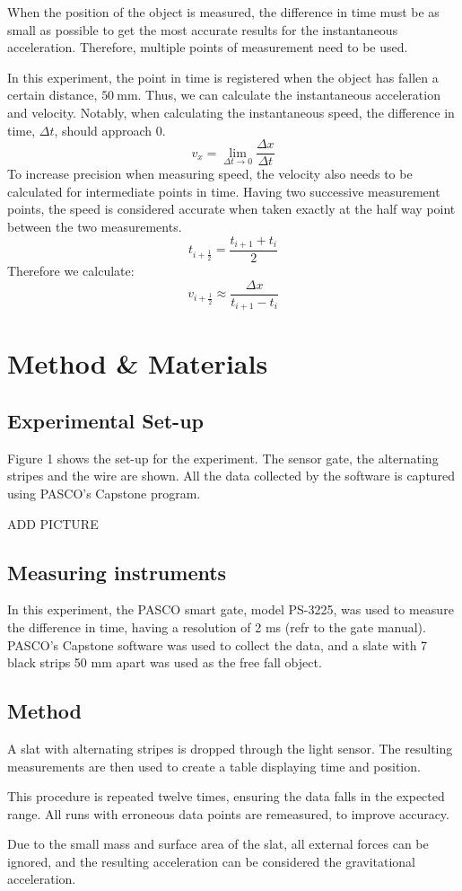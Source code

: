 \documentclass[a4paper]{article}
\newcommand{\unit}[1]{~\mathrm{#1}}
\begin{document}
\begin{justify}
\noindent
When the position of the object is measured, the difference in time must be as
small as possible to get the most accurate results for the instantaneous
acceleration. Therefore, multiple points of measurement need to be used.

\noindent
In this experiment, the point in time is registered when the object has fallen a
certain distance, $50\unit{mm}$. Thus, we can calculate the instantaneous
acceleration and velocity. Notably, when calculating the instantaneous speed,
the difference in time, $\Delta t$, should approach 0.
\begin{equation}
    v_x = \lim_{\Delta t \rightarrow 0}\frac{\Delta x}{\Delta t}
\end{equation}
To increase precision when measuring speed, the velocity also needs to be
calculated for intermediate points in time. Having two successive measurement
points, the speed is considered accurate when taken exactly at the half way
point between the two measurements.
\begin{equation}
    t_{i+\frac{1}{2}} = \frac{t_{i+1} + t_i}{2}
\end{equation}
Therefore we calculate:
\begin{equation}
    v_{i+\frac{1}{2}} \approx \frac{\Delta x}{t_{i+1} - t_i}
\end{equation}
\section{Method \& Materials}
\subsection{Experimental Set-up}
Figure 1 shows the set-up for the experiment. The sensor gate, the alternating
stripes and the wire are shown. All the data collected by the software is
captured using PASCO's Capstone program.

ADD PICTURE
\subsection{Measuring instruments}
In this experiment, the PASCO smart gate, model PS-3225,  was used to measure the difference in
time, having a resolution of 2 ms (refr to the gate manual). PASCO's Capstone
software was used to collect the data, and a slate with 7 black strips 50 mm
apart was used as the free fall object.
\subsection{Method}
A slat with alternating stripes is dropped through the light sensor. The
resulting measurements are then used to create a table displaying time and
position. 

\noindent
This procedure is repeated twelve times, ensuring the data falls in the expected
range. All runs with erroneous data points are remeasured, to improve accuracy. 

\noindent
Due to the small mass and surface area of the slat, all external forces can be
ignored, and the resulting acceleration can be considered the gravitational acceleration.
\end{justify}
\end{document}
